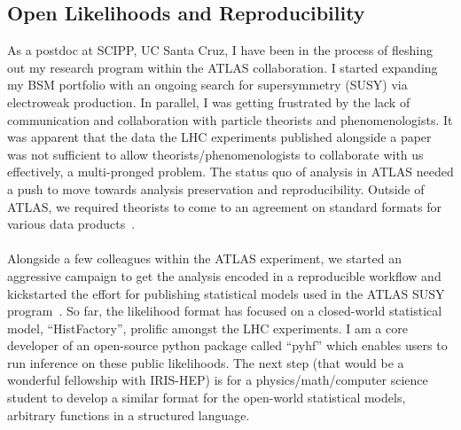 \documentclass[10pt,a4paper,sans]{moderncv} %
\begin{document}
\subsection{Open Likelihoods and Reproducibility}
As a postdoc at SCIPP, UC Santa Cruz, I have been in the process of fleshing out my research program within the ATLAS collaboration. I started expanding my BSM portfolio with an ongoing search for supersymmetry (SUSY) via electroweak production. In parallel, I was getting frustrated by the lack of communication and collaboration with particle theorists and phenomenologists. It was apparent that the data the LHC experiments published alongside a paper was not sufficient to allow theorists/phenomenologists to collaborate with us effectively, a multi-pronged problem. The status quo of analysis in ATLAS needed a push to move towards analysis preservation and reproducibility. Outside of ATLAS, we required theorists to come to an agreement on standard formats for various data products~\cite{Cranmer:2021urp, Heinrich2021}.
\\
\\
Alongside a few colleagues within the ATLAS experiment, we started an aggressive campaign to get the analysis encoded in a reproducible workflow and kickstarted the effort for publishing statistical models used in the ATLAS SUSY program~\cite{ATL-PHYS-PUB-2019-029}. So far, the likelihood format has focused on a closed-world statistical model, ``HistFactory'', prolific amongst the LHC experiments. I am a core developer of an open-source python package called ``pyhf'' which enables users to run inference on these public likelihoods. The next step (that would be a wonderful fellowship with IRIS-HEP) is for a physics/math/computer science student to develop a similar format for the open-world statistical models, arbitrary functions in a structured language.
\end{document}
